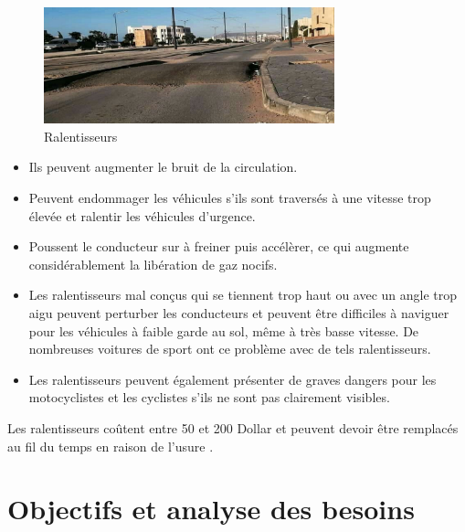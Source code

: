 \begin{figure}[h!]
  \center
  \includegraphics[width=0.75\textwidth]{Images/chapter1/Speedbump.jpg}
  \caption{Ralentisseurs}
\end{figure}
\renewcommand{\labelitemi}{$\bullet$}
\begin{itemize}
  \item Ils peuvent augmenter le bruit de la circulation.
  \item Peuvent endommager les véhicules s'ils sont traversés à une vitesse trop élevée et ralentir les véhicules d'urgence.
  \item Poussent le conducteur sur à freiner puis accélèrer, ce qui augmente considérablement la libération de gaz nocifs.
  \item Les ralentisseurs mal conçus qui se tiennent trop haut ou avec un angle
        trop aigu peuvent perturber les conducteurs et peuvent être difficiles à naviguer pour les véhicules à faible garde au sol,
        même à très basse vitesse. De nombreuses voitures de sport ont ce problème avec de tels ralentisseurs.
  \item Les ralentisseurs peuvent également présenter de graves dangers pour les motocyclistes et les cyclistes s'ils ne sont pas clairement visibles.
\end{itemize}

Les ralentisseurs coûtent entre 50 et 200 Dollar et peuvent devoir être remplacés au fil du temps
en raison de l'usure \cite{SpeedBump2020}.



\section{Objectifs et analyse des besoins}

